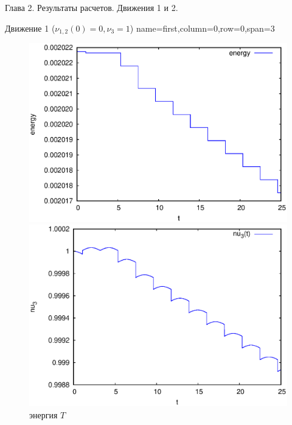 \begin{myposter}{
    Глава 2. Результаты расчетов. Движения 1 и 2.
}

    \headerbox
    {Движение 1 ($\nu_{1,2}(0) = 0, \nu_3 = 1$)}
    {name=first,column=0,row=0,span=3}
    {
        {\huge\bf
            \vspace{10pt}
            \begin{figure}[H]
                \centering
                    \centering
                    \includegraphics[width=\linewidth]{content/pic/self_rot_25/kin_en.eps}
                    \vspace{-15pt}
                    \caption{{\huge{} энергия $T$}}
                \endminipage
                \enspace
                    \centering
                    \includegraphics[width=\linewidth]{content/pic/self_rot_25/nu3.eps}

\end{figure}}}
\end{myposter}
